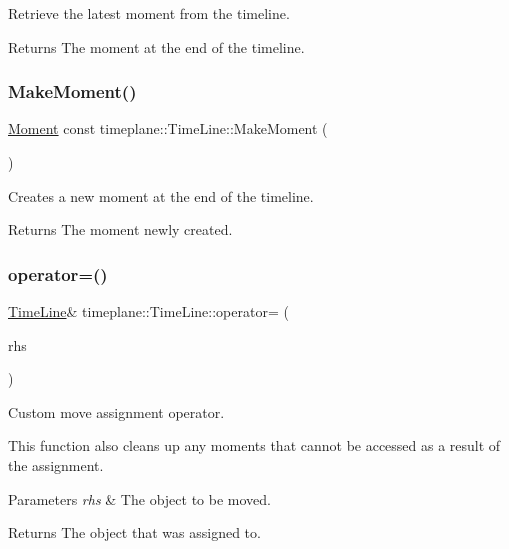 Retrieve the latest moment from the timeline. 

\begin{DoxyReturn}{Returns}
The moment at the end of the timeline. 
\end{DoxyReturn}
\mbox{\label{classtimeplane_1_1_time_line_a7520362a8b33962371b1a47831b37b03}} 
\subsubsection{\texorpdfstring{Make\+Moment()}{MakeMoment()}}
{\footnotesize\ttfamily \hyperlink{classtimeplane_1_1_moment}{Moment} const timeplane\+::\+Time\+Line\+::\+Make\+Moment (\begin{DoxyParamCaption}{ }\end{DoxyParamCaption})}



Creates a new moment at the end of the timeline. 

\begin{DoxyReturn}{Returns}
The moment newly created. 
\end{DoxyReturn}
\mbox{\label{classtimeplane_1_1_time_line_a14e1d9701e1a6571458343e0831855b6}} 
\subsubsection{\texorpdfstring{operator=()}{operator=()}}
{\footnotesize\ttfamily \hyperlink{classtimeplane_1_1_time_line}{Time\+Line}\& timeplane\+::\+Time\+Line\+::operator= (\begin{DoxyParamCaption}\item[{\hyperlink{classtimeplane_1_1_time_line}{Time\+Line} \&\&}]{rhs }\end{DoxyParamCaption})\hspace{0.3cm}{\ttfamily [inline]}}



Custom move assignment operator. 

This function also cleans up any moments that cannot be accessed as a result of the assignment. 
\begin{DoxyParams}{Parameters}
{\em rhs} & The object to be moved. \\
\hline
\end{DoxyParams}
\begin{DoxyReturn}{Returns}
The object that was assigned to. 
\end{DoxyReturn}
\mbox{\label{classtimeplane_1_1_time_line_a4297da8acc6fbee73bfc7db0de2f80a5}} 
